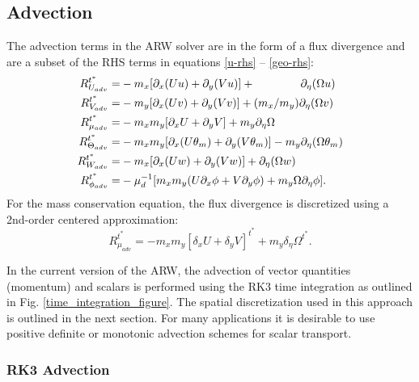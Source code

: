 \subsection{Advection}
\label{advection}

The advection terms in the ARW solver are in the form of a flux divergence and
are a subset of the RHS terms in equations \eqref{u-rhs} --
\eqref{geo-rhs}:
%
\begin{align}
R_{U_{adv}}^{t^*} = &
- m_x[\partial_x(Uu) + \partial_y(Vu)] + \hphantom{(m_x/m_y)} \partial_\eta (\Omega u)
\\
%
R_{V_{adv}}^{t^*} = &
- m_y[\partial_x (Uv) + \partial_y (Vv)] + (m_x/m_y) \partial_\eta (\Omega v)
\\ 
%
R_{\mu_{adv}}^{t^*} = &
- m_x m_y[\partial_x U + \partial_y V] + m_y \partial_\eta\Omega
\\
R_{\Theta_{adv}}^{t^*} = &
- m_x m_y [\partial_x (U\theta_m) + \partial_y (V\theta_m)] - m_y \partial_\eta
(\Omega \theta_m) 
\\
%
R_{W_{adv}}^{t^*} = &
- m_x [\partial_x (Uw) + \partial_y (Vw)] + \partial_\eta
(\Omega w) 
\\
%
R_{\phi_{adv}}^{t^*} = &
- \mu_d^{-1}
[m_x m_y (U\partial_x \phi + V\partial_y \phi) + m_y
\Omega\partial_\eta\phi].
\end{align}
%
\noindent
For the mass conservation equation, the flux divergence is discretized
using a 2nd-order centered approximation:
%
\begin{equation}
R_{\mu_{adv}}^{t^*} = 
- m_x m_y [\delta_x U + \delta_y V]^{t^*} + m_y \delta_\eta \Omega^{t^*}.
\end{equation}
%

In the current version of the ARW, the advection of vector quantities
(momentum) and scalars is performed
using the RK3 time integration as outlined in Fig. 
\ref{time_integration_figure}.  The spatial discretization used in this
approach is outlined in the next section.  For many applications it
is desirable to use positive definite or monotonic advection schemes
for scalar transport.  


\subsubsection{RK3 Advection}
\label{rk3-advection}

